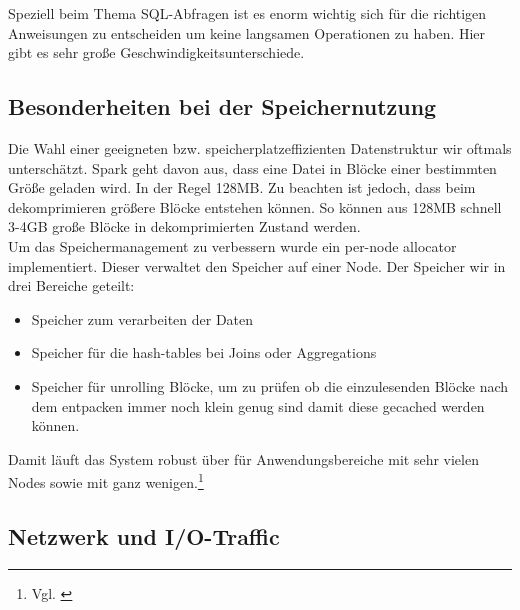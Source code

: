 \noindent
Speziell beim Thema SQL-Abfragen ist es enorm wichtig sich für die richtigen Anweisungen zu entscheiden um keine langsamen Operationen zu haben. 
Hier gibt es sehr große Geschwindigkeitsunterschiede.



\subsection{Besonderheiten bei der Speichernutzung}
Die Wahl einer geeigneten bzw. speicherplatzeffizienten Datenstruktur wir oftmals unterschätzt. 
Spark geht davon aus, dass eine Datei in Blöcke einer bestimmten Größe geladen wird. In der Regel 128MB. Zu beachten ist jedoch, dass beim dekomprimieren größere Blöcke entstehen können. So können aus 128MB schnell 3-4GB große Blöcke in dekomprimierten Zustand werden. \\ 

\noindent
Um das Speichermanagement zu verbessern wurde ein per-node allocator implementiert. Dieser verwaltet den Speicher auf einer Node. 
Der Speicher wir in drei Bereiche geteilt:
\begin{itemize}
	\item Speicher zum verarbeiten der Daten
	\item Speicher für die hash-tables bei Joins oder Aggregations
	\item Speicher für \glqq{}unrolling\grqq{} Blöcke, um zu prüfen ob die einzulesenden Blöcke nach dem entpacken immer noch klein genug sind damit diese gecached werden können.
\end{itemize}
\noindent
Damit läuft das System robust über für Anwendungsbereiche mit sehr vielen Nodes sowie mit ganz wenigen.\footnote{Vgl. \cite{ADD+15}}

\subsection{Netzwerk und I/O-Traffic}

